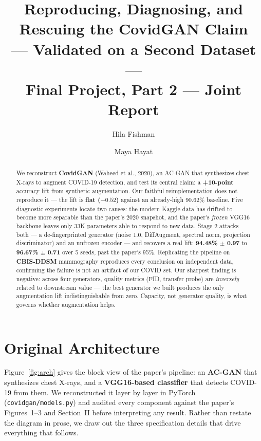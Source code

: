 \documentclass[11pt]{article}
\title{\textbf{Reproducing, Diagnosing, and Rescuing the CovidGAN Claim}\\[2pt] 
\large --- Validated on a Second Dataset ---\\[6pt] 
\normalsize Final Project, Part 2 --- Joint Report}
\author{Hila Fishman \and Maya Hayat}
\date{}
\newcommand{\code}[1]{\texttt{#1}}
\begin{document}
 
\maketitle 
\vspace{-2.0em}

\begin{abstract}
We reconstruct \textbf{CovidGAN} (Waheed et al., 2020), an AC-GAN that synthesizes chest X-rays to augment COVID-19 detection, and test its central claim: a \textbf{+10-point} accuracy lift from synthetic augmentation. Our faithful reimplementation does not reproduce it --- the lift is \textbf{flat ($-0.52$)} against an already-high 90.62\% baseline. Five diagnostic experiments locate two causes: the modern Kaggle data has drifted to become more separable than the paper's 2020 snapshot, and the paper's \emph{frozen} VGG16 backbone leaves only 33K parameters able to respond to new data. Stage 2 attacks both --- a de-fingerprinted generator (noise 1.0, DiffAugment, spectral norm, projection discriminator) and an unfrozen encoder --- and recovers a real lift: \textbf{94.48\% $\pm$ 0.97} to \textbf{96.67\% $\pm$ 0.71} over 5 seeds, past the paper's 95\%. Replicating the pipeline on \textbf{CBIS-DDSM} mammography reproduces every conclusion on independent data, confirming the failure is not an artifact of our COVID set. Our sharpest finding is negative: across four generators, quality metrics (FID, transfer probe) are \emph{inversely} related to downstream value --- the best generator we built produces the only augmentation lift indistinguishable from zero. Capacity, not generator quality, is what governs whether augmentation helps.
\end{abstract}

\section{Original Architecture} \label{sec:original_architecture}
Figure~\ref{fig:arch} gives the block view of the paper's pipeline: an \textbf{AC-GAN} that synthesizes chest X-rays, and a \textbf{VGG16-based classifier} that detects COVID-19 from them. We reconstructed it layer by layer in PyTorch (\code{covidgan/models.py}) and audited every component against the paper's Figures~1--3 and Section~II before interpreting any result. Rather than restate the diagram in prose, we draw out the three specification details that drive everything that follows.
\end{document}
